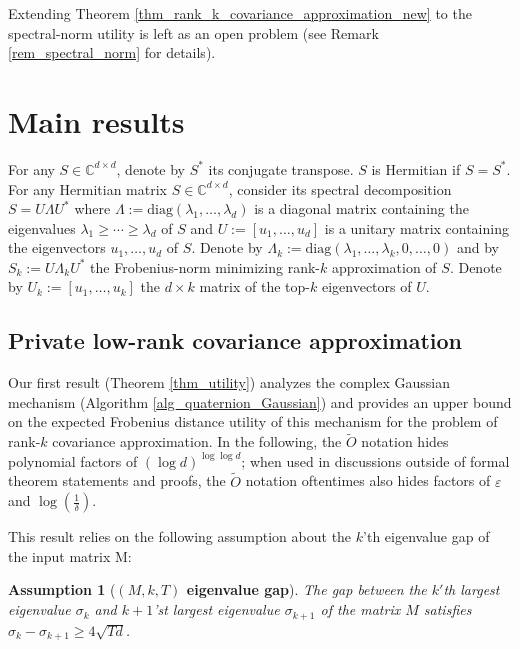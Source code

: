 \documentclass[11pt,letterpaper]{article}
\renewcommand{\epsilon}{\varepsilon}
\newtheorem{assumption}[theorem]{Assumption}
\begin{document}
Extending Theorem \ref{thm_rank_k_covariance_approximation_new} to the spectral-norm utility is left as an open problem (see Remark \ref{rem_spectral_norm} for details).
\color{black}

\section{Main results}

For any $S \in \mathbb{C}^{d \times d}$, denote by $S^\ast$ its conjugate transpose. 
%
$S$ is Hermitian if $S=S^\ast$.
%
For any Hermitian matrix $S \in \mathbb{C}^{d \times d}$, consider its spectral decomposition $S = U \Lambda U^\ast$ where $\Lambda := \mathrm{diag}(\lambda_1,\ldots, \lambda_d)$ is a diagonal matrix containing the eigenvalues $\lambda_1 \geq \cdots \geq \lambda_d$ of $S$ and $U  := [u_1, \ldots, u_d]$ is a unitary matrix containing the eigenvectors $u_1, \ldots, u_d$ of $S$.
%
Denote by $\Lambda_k := \mathrm{diag}(\lambda_1,\ldots, \lambda_k, 0,\ldots,0)$ and by $S_k := U\Lambda_k U^\ast$ the Frobenius-norm minimizing rank-$k$ approximation of $S$.
%
Denote by $U_k := [u_1, \ldots, u_k]$ the $d \times k$ matrix of the top-$k$ eigenvectors of $U$.


\subsection{Private low-rank covariance approximation} \label{sec_our_results_1}

Our first result (Theorem \ref{thm_utility}) analyzes the complex Gaussian mechanism (Algorithm \ref{alg_quaternion_Gaussian})  and provides an upper bound on the expected Frobenius distance utility of this mechanism for the problem of rank-$k$ covariance approximation.
%
%
In the following, the $\tilde{O}$ notation hides polynomial factors of $(\log d)^{\log \log d}$; when used in discussions outside of formal theorem statements and proofs, the $\tilde{O}$ notation oftentimes also hides factors of $\epsilon$ and $\log(\frac{1}{\delta})$.


 This result relies on the following assumption about the $k$'th eigenvalue gap of the input matrix M:
%
\begin{assumption}[\bf $(M, k, T)$ eigenvalue gap]\label{assumption_gap}
The gap between the $k'$th largest eigenvalue $\sigma_k$ and $k+1$'st largest eigenvalue $\sigma_{k+1}$ of the matrix $M$ satisfies  $\sigma_k - \sigma_{k+1} \geq 4\sqrt{Td} $.
\end{assumption}
\color{black}
\end{document}

